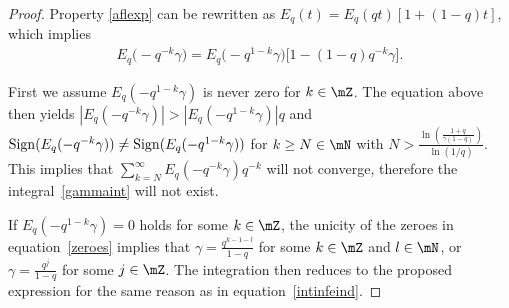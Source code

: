\begin{proof}
Property \eqref{aflexp} can be rewritten as $E_q(t)=E_q(qt)\left[1+(1-q)t\right]$, which implies
\begin{gather*}
E_q\big({-}q^{-k}\gamma\big) = E_q\big({-}q^{1-k}\gamma\big)\big[1-(1-q)q^{-k}\gamma\big].
\end{gather*}

First we assume $E_q(-q^{1-k}\gamma)$ is never zero for $k\in\mZ$. The equation above then yields $\left|E_q(-q^{-k}\gamma)\right|>\left|E_q(-q^{1-k}\gamma)\right|q$ and ${\rm Sign}(E_q(-q^{-k}\gamma))\not={\rm Sign}(E_q(-q^{1-k}\gamma))$ for $k\ge N\in\mN$ with $N>\frac{\ln\left(\frac{1+q}{\gamma(1-q)}\right)}{\ln(1/q)}$. This implies that $\sum\limits_{k=N}^\infty E_q(-q^{-k}\gamma)q^{-k}$ will not converge, therefore the integral~\eqref{gammaint} will not exist.

If $E_q(-q^{1-k}\gamma)=0$ holds for some $k\in\mZ$, the unicity of the zeroes in equation~\eqref{zeroes} implies that $\gamma=\frac{q^{k-1-l}}{1-q}$ for some $k\in\mZ$ and $l\in\mN$, or $\gamma=\frac{q^{j}}{1-q}$ for some $j\in\mZ$. The integration then reduces to the proposed expression for the same reason as in equation~\eqref{intinfeind}.
\end{proof}



